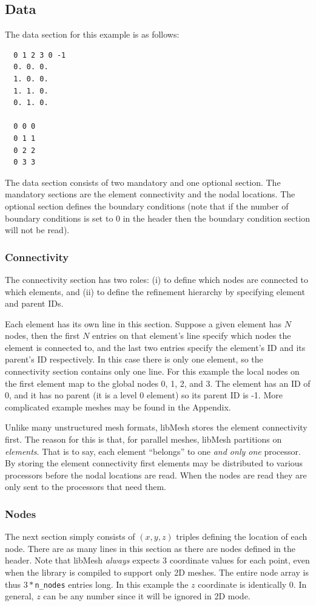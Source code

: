 \documentclass[12pt]{article}
\begin{document}
\subsection{Data}
The data section for this example is as follows:
\small
\begin{verbatim}
  0 1 2 3 0 -1
  0. 0. 0.
  1. 0. 0.
  1. 1. 0.
  0. 1. 0.

  0 0 0
  0 1 1
  0 2 2
  0 3 3
\end{verbatim}
\normalsize

The data section consists of two mandatory and one optional section.  The mandatory sections are the element connectivity and the nodal locations.  The optional section defines the boundary conditions (note that if the number of boundary conditions is set to 0 in the header then the boundary condition section will not be read).

\subsubsection{Connectivity}
The connectivity section has two roles: (i) to define which nodes are connected to which elements, and (ii) to define the refinement hierarchy by specifying element and parent IDs.

Each element has its own line in this section. Suppose a given element has $N$ nodes, then the first $N$ entries on that element's line specify which nodes the element is connected to, and the last two entries specify the element's ID and its parent's ID respectively. In this case there is only one element, so the connectivity section contains only one line.  For this example the local nodes on the first element map to the global nodes 0, 1, 2, and 3. The element has an ID of 0, and it has no parent (it is a level 0 element) so its parent ID is -1.  More complicated example meshes may be found in the Appendix.

Unlike many unstructured mesh formats, libMesh stores the element connectivity first.  The reason for this is that, for parallel meshes, libMesh partitions on \emph{elements}.  That is to say, each element ``belongs'' to one \emph{and only one} processor.  By storing the element connectivity first elements may be distributed to various processors before the nodal locations are read.  When the nodes are read they are only sent to the processors that need them.

\subsubsection{Nodes}
The next section simply consists of $(x,y,z)$ triples defining the location of each node.  There are as many lines in this section as there are nodes defined in the header.  Note that libMesh \emph{always} expects 3 coordinate values for each point, even when the library is compiled to support only 2D meshes. The entire node array is thus $3*$\texttt{n\_nodes} entries long.  In this example the $z$ coordinate is identically 0.  In general, $z$ can be any number since it will be ignored in 2D mode.
\end{document}
